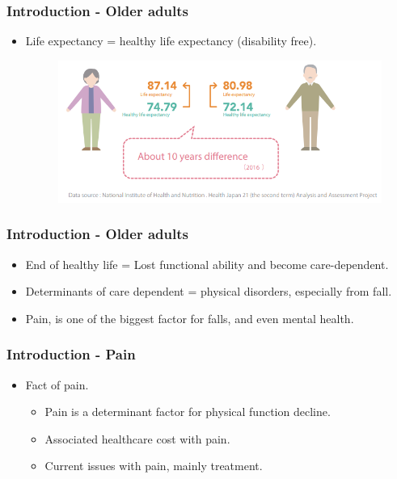 \documentclass[dvipdfmx]{beamer}\usepackage[]{graphicx}\usepackage[]{color}
\begin{document}
\begin{frame}
	\frametitle{Introduction - Older adults}
	\begin{itemize}
		\item Life expectancy = healthy life expectancy (disability free).
			\begin{figure}[H]
				\centering
				\includegraphics [width=\textwidth] {img/healthylife_jp.PNG}
			\end{figure}
	\end{itemize}
\end{frame}

\begin{frame}
	\frametitle{Introduction - Older adults}
	\begin{itemize}
		\item End of healthy life = Lost functional ability and become care-dependent.
		\item Determinants of care dependent = physical disorders, especially from fall. 
		\item Pain, is one of the biggest factor for falls, and even mental health.
			\begin{figure}[H]
				\centering
				
			\end{figure}
	\end{itemize}
\end{frame}

\begin{frame}
	\frametitle{Introduction - Pain}
	\begin{itemize}
		\item Fact of pain.
			\begin{itemize}
				\item Pain is a determinant factor for physical function decline.
				\item Associated healthcare cost with pain.
				\item Current issues with pain, mainly treatment.
			\end{itemize}

	\end{itemize}
\end{frame}
\end{document}
